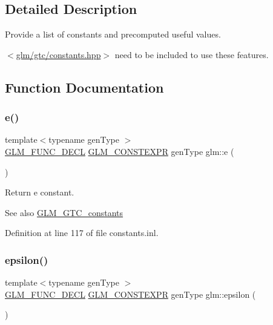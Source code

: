 \subsection{Detailed Description}
Provide a list of constants and precomputed useful values. 

$<$\mbox{\hyperlink{constants_8hpp}{glm/gtc/constants.\+hpp}}$>$ need to be included to use these features. 

\subsection{Function Documentation}
\mbox{\label{group__gtc__constants_ga4b7956eb6e2fbedfc7cf2e46e85c5139}} 
\subsubsection{\texorpdfstring{e()}{e()}}
{\footnotesize\ttfamily template$<$typename gen\+Type $>$ \\
\mbox{\hyperlink{setup_8hpp_ab2d052de21a70539923e9bcbf6e83a51}{G\+L\+M\+\_\+\+F\+U\+N\+C\+\_\+\+D\+E\+CL}} \mbox{\hyperlink{setup_8hpp_a08b807947b47031d3a511f03f89645ad}{G\+L\+M\+\_\+\+C\+O\+N\+S\+T\+E\+X\+PR}} gen\+Type glm\+::e (\begin{DoxyParamCaption}{ }\end{DoxyParamCaption})}

Return e constant. \begin{DoxySeeAlso}{See also}
\mbox{\hyperlink{group__gtc__constants}{G\+L\+M\+\_\+\+G\+T\+C\+\_\+constants}} 
\end{DoxySeeAlso}


Definition at line 117 of file constants.\+inl.

\mbox{\label{group__gtc__constants_ga2a1e57fc5592b69cfae84174cbfc9429}} 
\subsubsection{\texorpdfstring{epsilon()}{epsilon()}}
{\footnotesize\ttfamily template$<$typename gen\+Type $>$ \\
\mbox{\hyperlink{setup_8hpp_ab2d052de21a70539923e9bcbf6e83a51}{G\+L\+M\+\_\+\+F\+U\+N\+C\+\_\+\+D\+E\+CL}} \mbox{\hyperlink{setup_8hpp_a08b807947b47031d3a511f03f89645ad}{G\+L\+M\+\_\+\+C\+O\+N\+S\+T\+E\+X\+PR}} gen\+Type glm\+::epsilon (\begin{DoxyParamCaption}{ }\end{DoxyParamCaption})}

